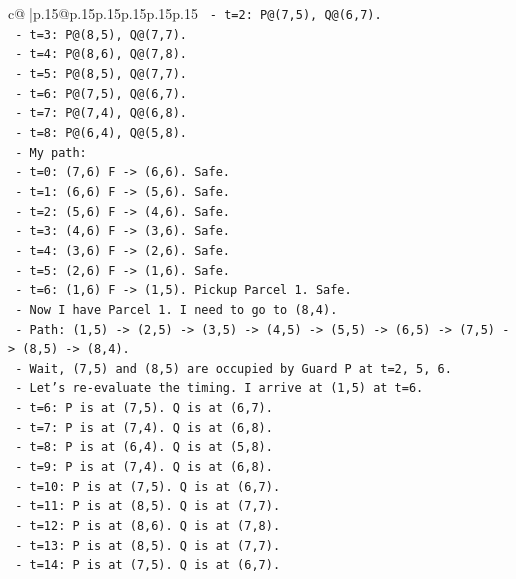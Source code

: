 \documentclass{article}
\begin{document}
{\begin{supertabular}{c@{$\;$}|p{.15\linewidth}@{}p{.15\linewidth}p{.15\linewidth}p{.15\linewidth}p{.15\linewidth}p{.15\linewidth}}
{{{\texttt{      {-} t=2: P@(7,5), Q@(6,7).} \\
\texttt{      {-} t=3: P@(8,5), Q@(7,7).} \\
\texttt{      {-} t=4: P@(8,6), Q@(7,8).} \\
\texttt{      {-} t=5: P@(8,5), Q@(7,7).} \\
\texttt{      {-} t=6: P@(7,5), Q@(6,7).} \\
\texttt{      {-} t=7: P@(7,4), Q@(6,8).} \\
\texttt{      {-} t=8: P@(6,4), Q@(5,8).} \\
\texttt{    {-} My path:} \\
\texttt{      {-} t=0: (7,6) F {-}> (6,6). Safe.} \\
\texttt{      {-} t=1: (6,6) F {-}> (5,6). Safe.} \\
\texttt{      {-} t=2: (5,6) F {-}> (4,6). Safe.} \\
\texttt{      {-} t=3: (4,6) F {-}> (3,6). Safe.} \\
\texttt{      {-} t=4: (3,6) F {-}> (2,6). Safe.} \\
\texttt{      {-} t=5: (2,6) F {-}> (1,6). Safe.} \\
\texttt{      {-} t=6: (1,6) F {-}> (1,5). Pickup Parcel 1. Safe.} \\
\texttt{    {-} Now I have Parcel 1. I need to go to (8,4).} \\
\texttt{    {-} Path: (1,5) {-}> (2,5) {-}> (3,5) {-}> (4,5) {-}> (5,5) {-}> (6,5) {-}> (7,5) {-}> (8,5) {-}> (8,4).} \\
\texttt{    {-} Wait, (7,5) and (8,5) are occupied by Guard P at t=2, 5, 6.} \\
\texttt{    {-} Let's re{-}evaluate the timing. I arrive at (1,5) at t=6.} \\
\texttt{    {-} t=6: P is at (7,5). Q is at (6,7).} \\
\texttt{    {-} t=7: P is at (7,4). Q is at (6,8).} \\
\texttt{    {-} t=8: P is at (6,4). Q is at (5,8).} \\
\texttt{    {-} t=9: P is at (7,4). Q is at (6,8).} \\
\texttt{    {-} t=10: P is at (7,5). Q is at (6,7).} \\
\texttt{    {-} t=11: P is at (8,5). Q is at (7,7).} \\
\texttt{    {-} t=12: P is at (8,6). Q is at (7,8).} \\
\texttt{    {-} t=13: P is at (8,5). Q is at (7,7).} \\
\texttt{    {-} t=14: P is at (7,5). Q is at (6,7).} \\
}}}
\end{supertabular}}
\end{document}
